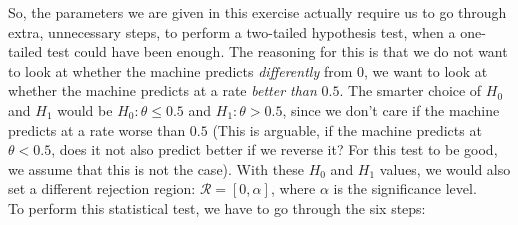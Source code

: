 So, the parameters we are given in this exercise actually require us to go through extra, unnecessary steps, to perform a two-tailed hypothesis test, when a one-tailed test could have been enough. The reasoning for this is that we do not want to look at whether the machine predicts \textit{differently} from $0$, we want to look at whether the machine predicts at a rate \textit{better than} $0.5$. The smarter choice of $H_0$ and $H_1$ would be $H_0: \theta \leq 0.5$ and $H_1: \theta > 0.5$, since we don't care if the machine predicts at a rate worse than $0.5$ (This is arguable, if the machine predicts at $\theta < 0.5$, does it not also predict better if we reverse it? For this test to be good, we assume that this is not the case). With these $H_0$ and $H_1$ values, we would also set a different rejection region: $\mathcal{R} = [0, \alpha]$, where $\alpha$ is the significance level.\\
To perform this statistical test, we have to go through the six steps:
